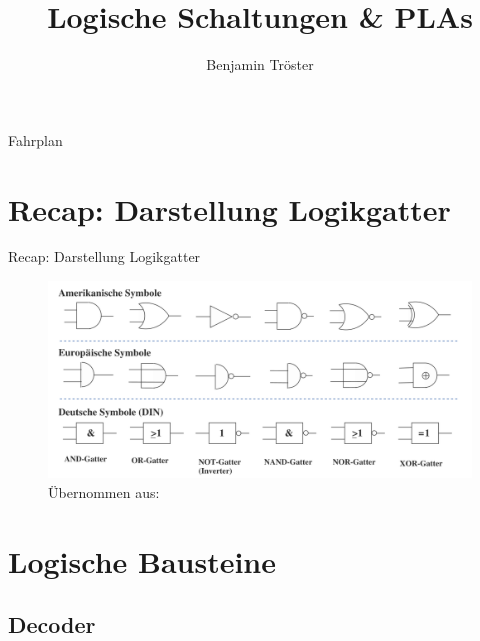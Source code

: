 \documentclass[12pt%
,xcolor=table
,aspectratio=169%
]{beamer}
\author{Benjamin Tröster}
\title[]{Logische Schaltungen \& PLAs }
\institute[HTW Berlin]{Hochschule für Technik und Wirtschaft Berlin}
\begin{document}
\begin{frame}
\titlepage
\end{frame}

\begin{frame}{Fahrplan}
\tableofcontents[hideothersubsections]
\end{frame}

\section{Recap: Darstellung Logikgatter}
\begin{frame}{Recap: Darstellung Logikgatter}
\begin{figure}
\center
\includegraphics[scale=0.35]{pictures/logikgatter}
\caption{Übernommen aus: \cite{hoffmann2020grundlagen}}
\end{figure}
\end{frame}

\section{Logische Bausteine}
\subsection{Decoder}
\end{document}
